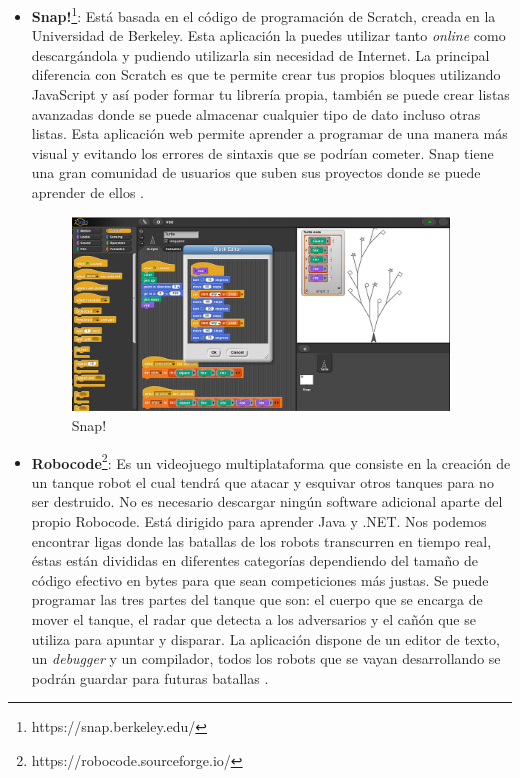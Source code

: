 \begin{itemize}
\item \textbf{Snap!}\footnote{https://snap.berkeley.edu/}: Está basada en el código de programación de Scratch, creada en la Universidad de Berkeley. Esta aplicación la puedes utilizar tanto \textit{online} como descargándola y pudiendo utilizarla sin necesidad de Internet. La principal diferencia con Scratch es que te permite crear tus propios bloques utilizando JavaScript y así poder formar tu librería propia, también se puede crear listas avanzadas donde se puede almacenar cualquier tipo de dato incluso otras listas.  Esta aplicación web permite aprender a programar de una manera más visual y evitando los errores de sintaxis que se podrían cometer. Snap tiene una gran comunidad de usuarios que suben sus proyectos donde se puede aprender de ellos \cite{app}.


\begin{figure}[H]
    \centering
    \includegraphics[width=10cm, keepaspectratio]{img/snap.png}
    \caption{Snap!}
    \label{fig:snap}
\end{figure}

\item\textbf{Robocode}\footnote{https://robocode.sourceforge.io/}: Es un videojuego multiplataforma que consiste en la creación de un tanque robot el cual tendrá que atacar y esquivar otros tanques para no ser destruido. No es necesario descargar ningún software adicional aparte del propio Robocode. Está dirigido para aprender Java y .NET. Nos podemos encontrar ligas donde las batallas de los robots transcurren en tiempo real, éstas están divididas en diferentes categorías dependiendo del tamaño de código efectivo en bytes para que sean competiciones más justas. Se puede programar las tres partes del tanque que son: el cuerpo que se encarga de mover el tanque, el radar que detecta a los adversarios y el cañón que se utiliza para apuntar y disparar. La aplicación dispone de un editor de texto, un \textit{debugger} y un compilador, todos los robots que se vayan desarrollando se podrán guardar para futuras batallas \cite{app}.



\end{itemize}
